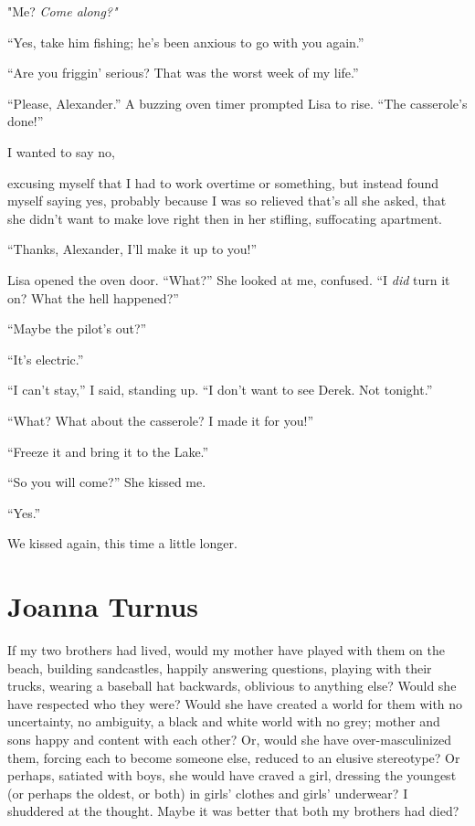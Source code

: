 "Me? \emph{Come along?"}

``Yes, take him fishing; he's been anxious to go with you again.''

``Are you friggin' serious? That was the worst week of my life.''

``Please, Alexander.'' A buzzing oven timer prompted Lisa to rise. ``The
casserole's done!''

I wanted to say no,

\enlargethispage{-2\baselineskip} excusing myself that I had to work overtime or
something, but instead found myself saying yes, probably because I was
so relieved that's all she asked, that she didn't want to make love
right then in her stifling, suffocating apartment.

``Thanks, Alexander, I'll make it up to you!''

Lisa opened the oven door. ``What?'' She looked at me, confused. ``I
\emph{did} turn it on? What the hell happened?''

``Maybe the pilot's out?''

``It's electric.''

``I can't stay,'' I said, standing up. ``I don't want to see Derek. Not
tonight.''

``What? What about the casserole? I made it for you!''

``Freeze it and bring it to the Lake.''

``So you will come?'' She kissed me.

``Yes.''

We kissed again, this time a little longer.

\chapter{Joanna Turnus}

\titlemark

If my two brothers had lived, would my mother have played with them on
the beach, building sandcastles, happily answering questions, playing
with their trucks, wearing a baseball hat backwards, oblivious to
anything else? Would she have respected who they were? Would she have
created a world for them with no uncertainty, no ambiguity, a black and
white world with no grey; mother and sons happy and content with each
other? Or, would she have over-masculinized them, forcing each to become
someone else, reduced to an elusive stereotype? Or perhaps, satiated
with boys, she would have craved a girl, dressing the youngest (or
perhaps the oldest, or both) in girls' clothes and girls' underwear? I
shuddered at the thought. Maybe it was better that both my brothers had
died?

